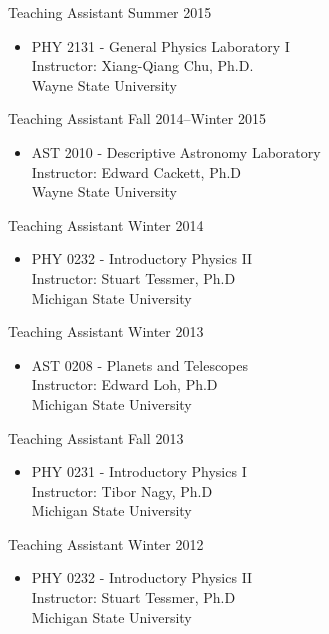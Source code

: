 \documentclass[10pt]{article}
\newenvironment{innerlist}[1][\enskip\textbullet]%
        {\begin{itemize}[#1,leftmargin=*,parsep=0pt,itemsep=0pt,topsep=0pt,partopsep=0pt]}
        {\end{itemize}}
\begin{document}
Teaching Assistant \hfill {Summer 2015}
\begin{innerlist}
\item[] PHY 2131 - General Physics Laboratory I\\
        Instructor: Xiang-Qiang Chu, Ph.D.\\
        Wayne State University 
\end{innerlist}

Teaching Assistant \hfill {Fall 2014--Winter 2015}
\begin{innerlist}
\item[] AST 2010 - Descriptive Astronomy Laboratory\\
        Instructor: Edward Cackett, Ph.D\\
        Wayne State University
\end{innerlist}

Teaching Assistant \hfill {Winter 2014}
\begin{innerlist}
\item[] PHY 0232 - Introductory Physics II\\
        Instructor: Stuart Tessmer, Ph.D\\
        Michigan State University
\end{innerlist}

Teaching Assistant \hfill {Winter 2013}
\begin{innerlist}
\item[] AST 0208 - Planets and Telescopes\\
        Instructor: Edward Loh, Ph.D\\
        Michigan State University
\end{innerlist}

Teaching Assistant \hfill {Fall 2013}
\begin{innerlist}
\item[] PHY 0231 - Introductory Physics I\\
        Instructor: Tibor Nagy, Ph.D\\
        Michigan State University
\end{innerlist}

Teaching Assistant \hfill {Winter 2012}
\begin{innerlist}
\item[] PHY 0232 - Introductory Physics II\\
        Instructor: Stuart Tessmer, Ph.D\\
        Michigan State University
\end{innerlist}
\end{document}
